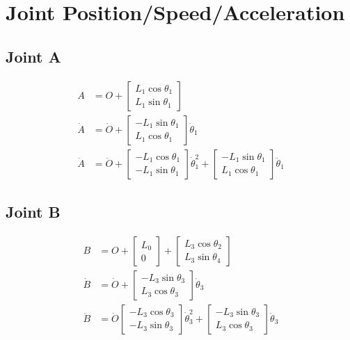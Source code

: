 \documentclass[letterpaper]{article}
\begin{document}
\section{Joint Position/Speed/Acceleration}
\subsection{Joint A}

\begin{align*}
	A &= O + \begin{bmatrix} L_1 \cos \theta_1 \\ L_1 \sin \theta_1 \end{bmatrix} \\
	\dot{A} &= \dot{O} + \begin{bmatrix} -L_1 \sin \theta_1 \\ L_1 \cos \theta_1 \end{bmatrix} \dot{\theta}_1 \\
	\ddot{A} &= \ddot{O} + \begin{bmatrix} -L_1 \cos \theta_1 \\ -L_1 \sin \theta_1 \end{bmatrix} \dot{\theta}_1^2 + \begin{bmatrix} -L_1 \sin \theta_1 \\ L_1 \cos \theta_1 \end{bmatrix} \ddot{\theta}_1
\end{align*}

\subsection{Joint B}

\begin{align*}
	B &= O + \begin{bmatrix} L_0 \\ 0 \end{bmatrix} + \begin{bmatrix} L_3 \cos \theta_2 \\ L_3 \sin \theta_4 \end{bmatrix} \\
	\dot{B} &= \dot{O} + \begin{bmatrix} -L_3 \sin \theta_3 \\ L_3 \cos \theta_3 \end{bmatrix} \dot{\theta}_3 \\
	\ddot{B} &= \ddot{O} \begin{bmatrix} -L_3 \cos \theta_3 \\ - L_3 \sin \theta_3 \end{bmatrix} \dot{\theta}_3^2 + \begin{bmatrix} -L_3 \sin \theta_3 \\ L_3 \cos \theta_3 \end{bmatrix} \ddot{\theta}_3 
\end{align*}
\end{document}
